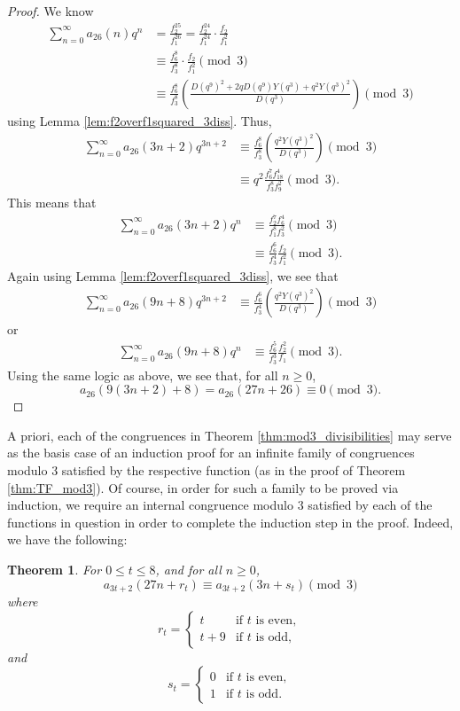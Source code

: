 \documentclass[10pt, reqno]{amsart}
\theoremstyle{theorem}
\newtheorem{theorem}{Theorem}[section]
\theoremstyle{definition}
\theoremstyle{example}
\begin{document}
\begin{proof}
\noindent 
We know 
\begin{align*}
\sum_{n=0}^\infty a_{26}(n)q^n 
&= 
\frac{f_2^{25}}{f_1^{26}} = 
\frac{f_2^{24}}{f_1^{24}}\cdot \frac{f_2}{f_1^2} \\
&\equiv 
\frac{f_{6}^8}{f_3^8}\cdot \frac{f_2}{f_1^2} \pmod{3}  \\
&\equiv 
\frac{f_6^8}{f_3^8}\left( \frac{D(q^9)^2 +2qD(q^9)Y(q^3)+q^2Y(q^3)^2}{D(q^3)}  \right) \pmod{3} 
\end{align*}
using Lemma \ref{lem:f2overf1squared_3diss}.  
Thus, 
\begin{align*}
\sum_{n=0}^\infty a_{26}(3n+2)q^{3n+2} 
&\equiv 
\frac{f_6^8}{f_3^8}\left( \frac{q^2Y(q^3)^2}{D(q^3)} \right) \pmod{3}  \\
&\equiv 
q^2\frac{f_6^7f_{18}^4}{f_3^8f_9^2} \pmod{3}.
\end{align*}
This means that
\begin{align*}
\sum_{n=0}^\infty a_{26}(3n+2)q^{n} 
&\equiv 
\frac{f_2^7f_{6}^4}{f_1^8f_3^2} \pmod{3} \\
&\equiv 
\frac{f_6^6}{f_3^4}\frac{f_2}{f_1^2} \pmod{3}.
\end{align*}
Again using Lemma \ref{lem:f2overf1squared_3diss}, we see that 
\begin{align*}
\sum_{n=0}^\infty a_{26}(9n+8)q^{3n+2} 
&\equiv 
\frac{f_6^6}{f_3^4} \left( \frac{q^2Y(q^3)^2}{D(q^3)} \right) \pmod{3}
\end{align*}
or 
\begin{align*}
\sum_{n=0}^\infty a_{26}(9n+8)q^{n} 
&\equiv 
\frac{f_6^5}{f_3^3}\frac{f_2^2}{f_1} \pmod{3}.
\end{align*}
Using the same logic as above, we see that, for all $n\geq 0$, 
\begin{equation*}
a_{26}(9(3n+2)+8) = a_{26}(27n+26) \equiv 0 \pmod{3}. 
\end{equation*}

\end{proof}

A priori, each of the congruences in Theorem \ref{thm:mod3_divisibilities} may serve as the basis case of an induction proof for an infinite family of congruences modulo 3 satisfied by the respective function (as in the proof of Theorem \ref{thm:TF_mod3}).  Of course, in order for such a family to be proved via induction, we require an internal congruence modulo 3 satisfied by each of the functions in question in order to complete the induction step in the proof.   
Indeed, we have the following: 

\begin{theorem}
For $0\leq t\leq 8$, and for all $n\geq 0$, 
$$
a_{3t+2}(27n+r_t) \equiv a_{3t+2}(3n+s_t) \pmod{3}
$$
where 
$$r_t = 
\begin{cases}
t & \text{if } t \text{ is even},\\
t+9 & \text{if } t \text{ is odd},
\end{cases}
$$
and 
$$s_t = 
\begin{cases}
0 & \text{if } t \text{ is even},\\
1 & \text{if } t \text{ is odd}.
\end{cases}
$$
\end{theorem}
\end{document}
